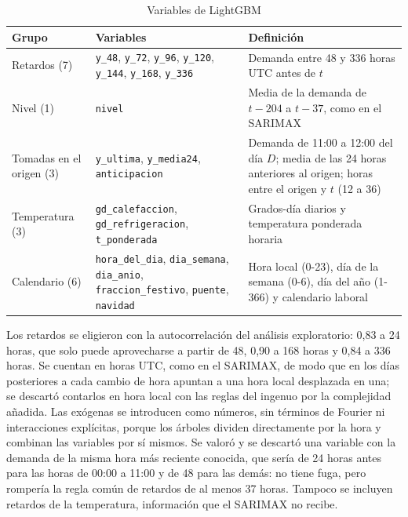 \begin{table}[htbp]
	\centering
	\caption{Variables de LightGBM}
	\label{tab:variables-lgbm}
	\small
	\begin{tabularx}{\textwidth}{>{\raggedright\arraybackslash}p{3.3cm} >{\raggedright\arraybackslash}p{4.4cm} >{\raggedright\arraybackslash}X}
		\hline
		\textbf{Grupo} & \textbf{Variables} & \textbf{Definición} \\
		\hline
		Retardos (7) & \texttt{y\_48}, \texttt{y\_72}, \texttt{y\_96}, \texttt{y\_120}, \texttt{y\_144}, \texttt{y\_168}, \texttt{y\_336} & Demanda entre 48 y 336 horas UTC antes de $t$ \\
		Nivel (1) & \texttt{nivel} & Media de la demanda de $t-204$ a $t-37$, como en el SARIMAX \\
		Tomadas en el origen (3) & \texttt{y\_ultima}, \texttt{y\_media24}, \texttt{anticipacion} & Demanda de 11:00 a 12:00 del día $D$; media de las 24 horas anteriores al origen; horas entre el origen y $t$ (12 a 36) \\
		Temperatura (3) & \texttt{gd\_calefaccion}, \texttt{gd\_refrigeracion}, \texttt{t\_ponderada} & Grados-día diarios y temperatura ponderada horaria \\
		Calendario (6) & \texttt{hora\_del\_dia}, \texttt{dia\_semana}, \texttt{dia\_anio}, \texttt{fraccion\_festivo}, \texttt{puente}, \texttt{navidad} & Hora local (0-23), día de la semana (0-6), día del año (1-366) y calendario laboral \\
		\hline
	\end{tabularx}
\end{table}

Los retardos se eligieron con la autocorrelación del análisis exploratorio:
0,83 a 24 horas, que solo puede aprovecharse a partir de 48, 0,90 a 168 horas
y 0,84 a 336 horas. Se cuentan en horas UTC, como en el SARIMAX, de modo que
en los días posteriores a cada cambio de hora apuntan a una hora local
desplazada en una; se descartó contarlos en hora local con las reglas del
ingenuo por la complejidad añadida. Las exógenas se introducen como números,
sin términos de Fourier ni interacciones explícitas, porque los árboles
dividen directamente por la hora y combinan las variables por sí mismos. Se
valoró y se descartó una variable con la demanda de la misma hora más
reciente conocida, que sería de 24 horas antes para las horas de 00:00 a
11:00 y de 48 para las demás: no tiene fuga, pero rompería la regla común de
retardos de al menos 37 horas. Tampoco se incluyen retardos de la
temperatura, información que el SARIMAX no recibe.

